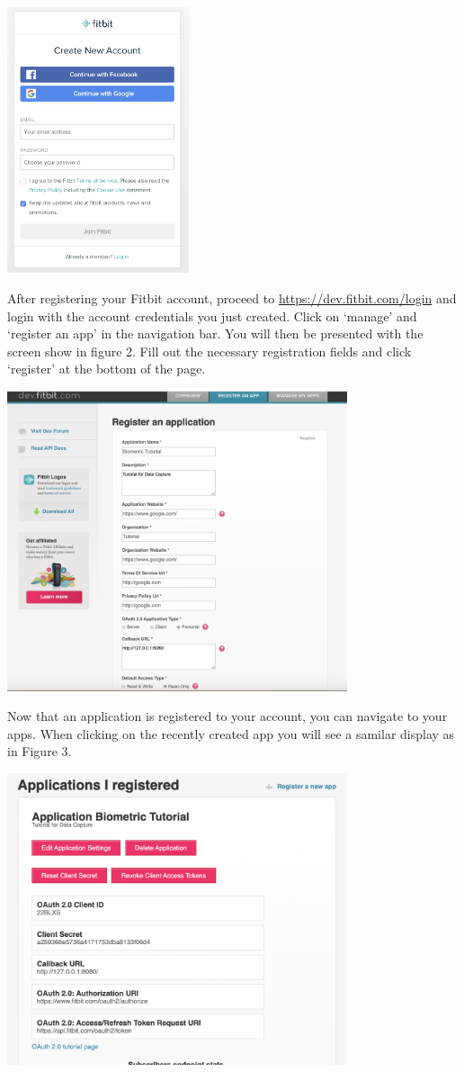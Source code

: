 \documentclass[]{book}
\begin{document}
\includegraphics[width=0.40000\textwidth]{images/fitbitAccount.png}

After registering your Fitbit account, proceed to
\url{https://dev.fitbit.com/login} and login with the account
credentials you just created. Click on `manage' and `register an app' in
the navigation bar. You will then be presented with the screen show in
figure 2. Fill out the necessary registration fields and click
`register' at the bottom of the page.

\includegraphics[width=0.75000\textwidth]{images/registerApp.png}

Now that an application is registered to your account, you can navigate
to your apps. When clicking on the recently created app you will see a
samilar display as in Figure 3.

\includegraphics[width=0.75000\textwidth]{images/appDetails.png}
\end{document}
